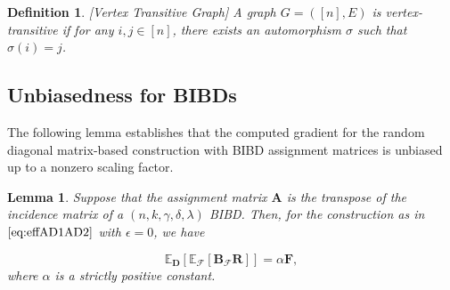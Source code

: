 \documentclass[journal,draftcls,onecolumn]{IEEEtran}
\theoremstyle{mystyle}
\newtheorem{defn}{Definition}
\newtheorem{lemma}{Lemma}
\newtheorem{remark}{Remark}
\newcommand{\bfA}{\mathbf{A}}
\newcommand{\bfP}{\mathbf{P}}
\newcommand{\cF}{\mathcal{F}}
\newcommand{\aditya}[1]{\marginpar{+}{\bf Aditya's remark}: {\em #1}}
\newcommand{\sifat}[1]{\marginpar{+}{\bf Sifat's remark}: {\em #1}}
\begin{document}
\begin{defn}{[{\it Vertex Transitive Graph}]}
A graph $G = ([n],E)$ is vertex-transitive if for any $i, j \in [n]$, there exists an automorphism $\sigma$ such that $\sigma(i) = j$.
\end{defn}






\subsection{Unbiasedness for BIBDs}

The following lemma establishes that the computed gradient for the random diagonal matrix-based construction with BIBD assignment matrices is unbiased up to a nonzero scaling factor.


\begin{lemma}
\label{lemma:BIBD_unbiasedness}
Suppose that the assignment matrix $\mathbf{A}$ is the transpose of the incidence matrix of a $(n,k,\gamma,\delta,\lambda)$ BIBD. %
Then, for the construction as in $\eqref{eq:effAD1AD2}$ with $\epsilon  = 0$, we have 

\[ \mathbb{E}_{\mathbf{D}}[\mathbb{E}_{\mathcal{F}}[\mathbf{B}_{\cF} \mathbf{R}]]= \alpha \mathbf{F},\]
where $\alpha$ is a strictly positive constant. %


\end{lemma}
\end{document}
